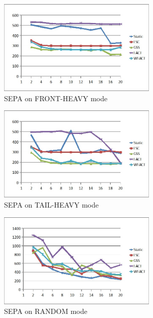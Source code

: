 \documentclass[10pt, twocolumn, letterpaper]{article}
\begin{document}
\begin{figure}[h]
\begin{center}  
  \includegraphics[height=45mm]{graphs/front.jpg}
  \caption{SEPA on \textsf{FRONT-HEAVY} mode}
\end{center}
\end{figure}

\begin{figure}[h]
\begin{center}  
  \includegraphics[height=45mm]{graphs/tail.jpg}
  \caption{SEPA on \textsf{TAIL-HEAVY} mode}
\end{center}
\end{figure}

\begin{figure}[h]
\begin{center}  
  \includegraphics[height=45mm]{graphs/random.jpg}
  \caption{SEPA on \textsf{RANDOM} mode}
\end{center}
\end{figure}

\paragraph{}
\end{document}
